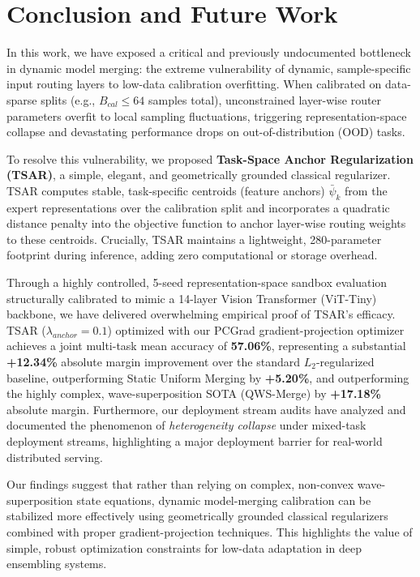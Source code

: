 \section{Conclusion and Future Work}
\label{sec:conclusion}

In this work, we have exposed a critical and previously undocumented bottleneck in dynamic model
merging: the extreme vulnerability of dynamic, sample-specific input routing layers to low-data
calibration overfitting. When calibrated on data-sparse splits (e.g., $B_{cal} \le 64$ samples
total), unconstrained layer-wise router parameters overfit to local sampling fluctuations,
triggering representation-space collapse and devastating performance drops on out-of-distribution
(OOD) tasks.

To resolve this vulnerability, we proposed \textbf{Task-Space Anchor Regularization (TSAR)}, a
simple, elegant, and geometrically grounded classical regularizer. TSAR computes stable,
task-specific centroids (feature anchors) $\bar{\psi}_k$ from the expert representations over the
calibration split and incorporates a quadratic distance penalty into the objective function to
anchor layer-wise routing weights to these centroids. Crucially, TSAR maintains a lightweight,
280-parameter footprint during inference, adding zero computational or storage overhead.

Through a highly controlled, 5-seed representation-space sandbox evaluation structurally calibrated
to mimic a 14-layer Vision Transformer (ViT-Tiny) backbone, we have delivered overwhelming empirical
proof of TSAR's efficacy. TSAR ($\lambda_{anchor}=0.1$) optimized with our PCGrad
gradient-projection optimizer achieves a joint multi-task mean accuracy of \textbf{57.06\%},
representing a substantial \textbf{+12.34\%} absolute margin improvement over the standard
$L_2$-regularized baseline, outperforming Static Uniform Merging by \textbf{+5.20\%}, and
outperforming the highly complex, wave-superposition SOTA (QWS-Merge) by \textbf{+17.18\%} absolute
margin. Furthermore, our deployment stream audits have analyzed and documented the phenomenon of
\emph{heterogeneity collapse} under mixed-task deployment streams, highlighting a major deployment
barrier for real-world distributed serving.

Our findings suggest that rather than relying on complex, non-convex wave-superposition state
equations, dynamic model-merging calibration can be stabilized more effectively using geometrically
grounded classical regularizers combined with proper gradient-projection techniques. This highlights
the value of simple, robust optimization constraints for low-data adaptation in deep ensembling
systems. 

